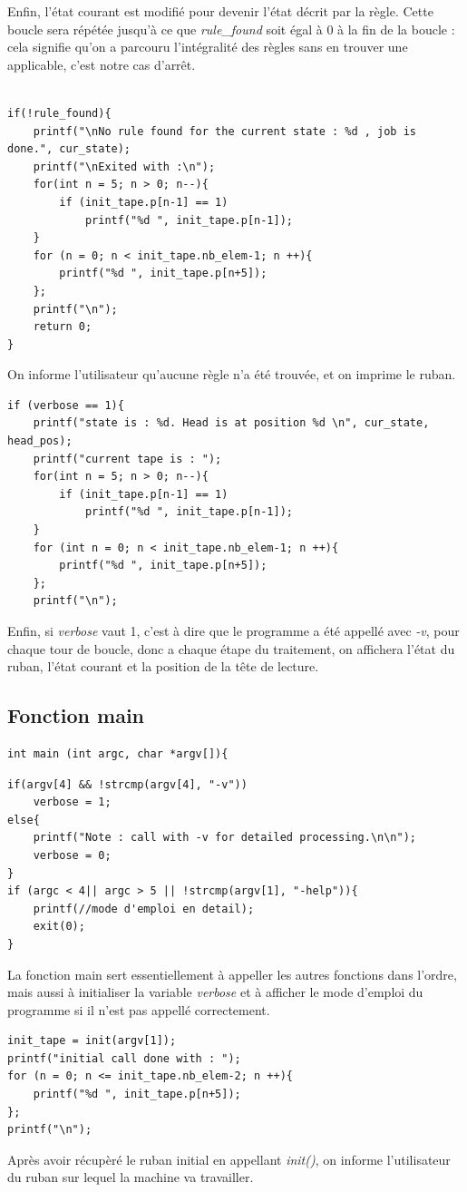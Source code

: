 \documentclass[12pt,a4paper]{report}
\begin{document}
Enfin, l'état courant est modifié pour devenir l'état décrit par la règle. Cette boucle sera répétée jusqu'à ce que \textit{rule\_found} soit égal à 0 à la fin de la boucle : cela signifie qu'on a parcouru l'intégralité des règles sans en trouver une applicable, c'est notre cas d'arrêt.\\\\
\begin{lstlisting}
if(!rule_found){
    printf("\nNo rule found for the current state : %d , job is done.", cur_state);
    printf("\nExited with :\n");
    for(int n = 5; n > 0; n--){
        if (init_tape.p[n-1] == 1)
            printf("%d ", init_tape.p[n-1]);
    }
    for (n = 0; n < init_tape.nb_elem-1; n ++){
        printf("%d ", init_tape.p[n+5]);
    };
    printf("\n");
    return 0;
}
\end{lstlisting}
On informe l'utilisateur qu'aucune règle n'a été trouvée, et on imprime le ruban.\\
\begin{lstlisting}
if (verbose == 1){
    printf("state is : %d. Head is at position %d \n", cur_state, head_pos);
    printf("current tape is : ");
    for(int n = 5; n > 0; n--){
        if (init_tape.p[n-1] == 1)
            printf("%d ", init_tape.p[n-1]);
    }
    for (int n = 0; n < init_tape.nb_elem-1; n ++){
        printf("%d ", init_tape.p[n+5]);
    };
    printf("\n");
\end{lstlisting}
Enfin, si \textit{verbose} vaut 1, c'est à dire que le programme a été appellé avec \textit{-v}, pour chaque tour de boucle, donc a chaque étape du traitement, on affichera l'état du ruban, l'état courant et la position de la tête de lecture.





\subsection{Fonction main}
\begin{verbatim}
int main (int argc, char *argv[]){
\end{verbatim}

\begin{lstlisting}
if(argv[4] && !strcmp(argv[4], "-v"))
    verbose = 1;
else{
    printf("Note : call with -v for detailed processing.\n\n");
    verbose = 0;
}
if (argc < 4|| argc > 5 || !strcmp(argv[1], "-help")){
    printf(//mode d'emploi en detail);
    exit(0);
}
\end{lstlisting}
La fonction main sert essentiellement à appeller les autres fonctions dans l'ordre, mais aussi à initialiser la variable \textit{verbose} et à afficher le mode d'emploi du programme si il n'est pas appellé correctement.\\
\begin{lstlisting}
init_tape = init(argv[1]);
printf("initial call done with : ");
for (n = 0; n <= init_tape.nb_elem-2; n ++){
    printf("%d ", init_tape.p[n+5]);
};
printf("\n");
\end{lstlisting}
Après avoir récupèré le ruban initial en appellant \textit{init()}, on informe l'utilisateur du ruban sur lequel la machine va travailler.
\end{document}
